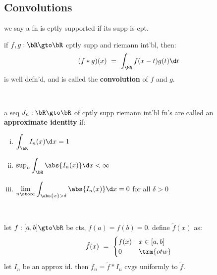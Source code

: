 \subsection{Convolutions}
we say a fn is cptly supported if its supp is cpt.
\begin{defn}
	if $f,g:\bR\gto\bR$ cptly supp and riemann int'bl, then:
	\begin{equation*}
		(f*g)(x) \ = \ \int_{\bR}f(x-t)g(t)\d t
	\end{equation*}
	is well defn'd, and is called the \textbf{convolution} of $f$ and $g$.
\end{defn} \

\begin{defn}
	a seq $J_{n}:\bR\gto\bR$  of cptly supp riemann int'bl fn's are
	called an \textbf{approximate identity} if:
	\begin{enumerate}[(i)]
		\item $\displaystyle\int_{\bR}I_{n}(x)\d x=1$
		\item $\sup_{n}\displaystyle\int_{\bR}\abs{I_{n}(x)}\d x<\infty$
		\item $\displaystyle\lim_{n\sto\infty}\int_{\abs{x}>\delta}\abs{I_{n}(x)}\d x=0$
			for all $\delta>0$
	\end{enumerate}
\end{defn} \

\begin{thm}
	let $f:[a,b]\gto\bR$ be cts, $f(a)=f(b)=0$. define $\tilde{f}(x)$ as:
	\begin{equation*}
		\tilde{f}(x) \ = \
		\begin{cases}
			f(x) & x\in[a,b] \\ 0 & \trm{otw}
		\end{cases}
	\end{equation*}
	let $I_{n}$ be an approx id.
	then $f_{n}=\tilde{f}*I_{n}$ cvgs uniformly to $\tilde{f}$.
\end{thm} \

